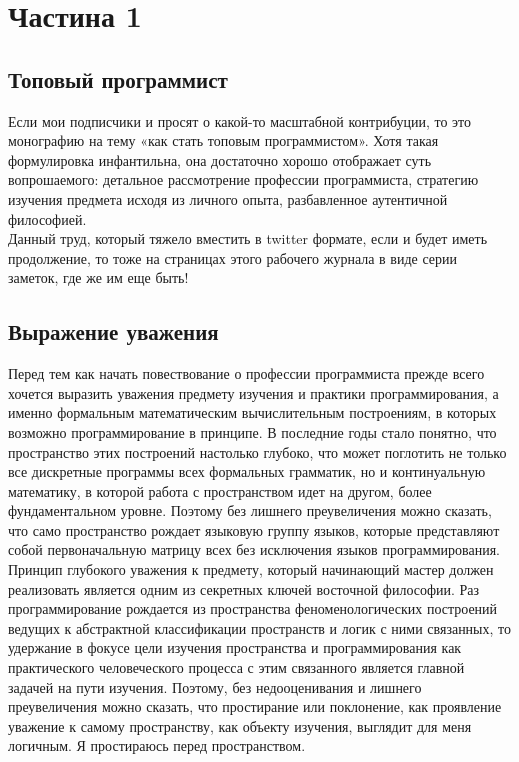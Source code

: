 \section{Частина 1}

\subsection{Топовый программист}

Если мои подписчики и просят о какой-то масштабной контрибуции,
то это монографию на тему «как стать топовым программистом».
Хотя такая формулировка инфантильна, она достаточно хорошо
отображает суть вопрошаемого: детальное рассмотрение профессии
программиста, стратегию изучения предмета исходя из личного
опыта, разбавленное аутентичной философией.
\\
Данный труд, который тяжело вместить в twitter формате, если
и будет иметь продолжение, то тоже на страницах этого рабочего
журнала в виде серии заметок, где же им еще быть!

\subsection{Выражение уважения}

Перед тем как начать повествование о профессии программиста
прежде всего хочется выразить уважения предмету изучения и
практики программирования, а именно формальным математическим
вычислительным построениям, в которых возможно программирование
в принципе. В последние годы стало понятно, что пространство
этих построений настолько глубоко, что может поглотить не
только все дискретные программы всех формальных грамматик,
но и континуальную математику, в которой работа с пространством
идет на другом, более фундаментальном уровне. Поэтому без лишнего
 преувеличения можно сказать, что само пространство рождает
языковую группу языков, которые представляют собой первоначальную
матрицу всех без исключения языков программирования.
\\
Принцип глубокого уважения к предмету, который начинающий
мастер должен реализовать является одним из секретных ключей
восточной философии. Раз программирование рождается из
пространства феноменологических построений ведущих к абстрактной
классификации пространств и логик с ними связанных, то удержание
в фокусе цели изучения пространства и программирования как
практического человеческого процесса с этим связанного является
главной задачей на пути изучения. Поэтому, без недооценивания и
лишнего преувеличения можно сказать, что простирание или поклонение,
как проявление уважение к самому пространству, как объекту изучения,
выглядит для меня логичным. Я простираюсь перед пространством.


